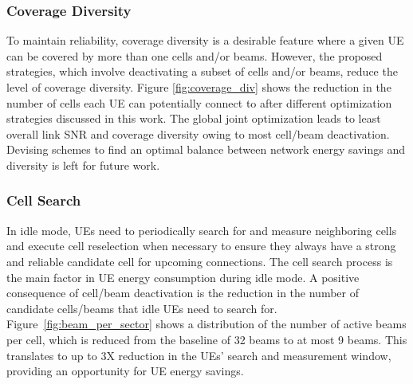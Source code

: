 \subsubsection{Coverage Diversity} 
To maintain reliability, coverage diversity is a desirable feature where a given UE can be covered by more than one cells and/or beams. However, the proposed strategies, which involve deactivating a subset of cells and/or beams, reduce the level of coverage diversity. 
Figure \ref{fig:coverage_div} shows the reduction in the number of cells each UE can potentially connect to after different optimization strategies discussed in this work. 
The global joint optimization leads to least overall link SNR and coverage diversity owing to most cell/beam deactivation.
Devising schemes to find an optimal balance between network energy savings and diversity is left for future work.


\subsubsection{Cell Search}
In idle mode, UEs need to periodically search for and measure neighboring cells and execute cell reselection when necessary to ensure they always have a strong and reliable candidate cell for upcoming connections. 
The cell search process is the main factor in UE energy consumption during idle mode. A positive consequence of cell/beam deactivation is the reduction in the number of candidate cells/beams that idle UEs need to search for. 
Figure~\ref{fig:beam_per_sector} shows a distribution of the number of active beams per cell, which is reduced from the baseline of 32 beams to at most 9 beams. This translates to up to 3X reduction in the UEs' search and measurement window, providing an opportunity for UE energy savings. 
\vspace{-2pt}




